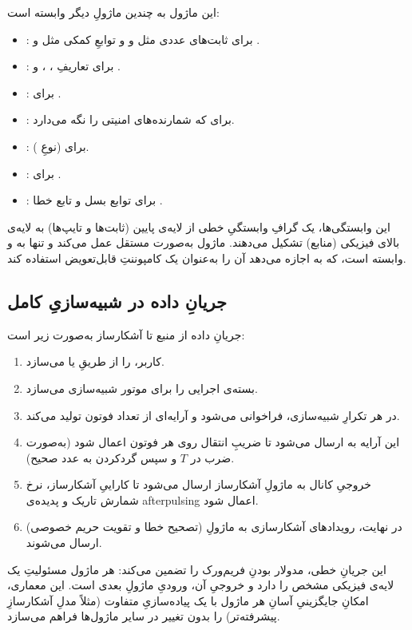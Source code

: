 این ماژول به چندین ماژولِ دیگر وابسته است:
\begin{itemize}
	\item {}: برای ثابت‌های عددی مثل  و  و توابعِ کمکی مثل  و .
	\item {}: برای تعاریفِ ، ،  و .
	\item {}: برای .
	\item {}: برای  که شمارنده‌های امنیتی را نگه می‌دارد.
	\item {}: برای  (نوعِ ).
	\item {}: برای .
	\item {}: برای توابع بسل  و تابع خطا .
\end{itemize}

این وابستگی‌ها، یک گرافِ وابستگیِ خطی از لایه‌ی پایین (ثابت‌ها و تایپ‌ها) به لایه‌ی بالای فیزیکی (منابع) تشکیل می‌دهند. ماژول  به‌صورت مستقل عمل می‌کند و تنها به  و  وابسته است، که به  اجازه می‌دهد آن را به‌عنوان یک کامپوننتِ قابل‌تعویض استفاده کند.

\subsection{جریانِ داده در شبیه‌سازیِ کامل}

جریانِ داده از منبع تا آشکارساز به‌صورت زیر است:
\begin{enumerate}
	\item کاربر،  را از طریقِ  یا  می‌سازد.
	\item {} بسته‌ی اجرایی را برای موتور شبیه‌سازی می‌سازد.
	\item در هر تکرارِ شبیه‌سازی،  فراخوانی می‌شود و آرایه‌ای از تعداد فوتون تولید می‌کند.
	\item این آرایه به  ارسال می‌شود تا ضریبِ انتقال روی هر فوتون اعمال شود (به‌صورت ضرب در $T$ و سپس گردکردن به عدد صحیح).
	\item خروجیِ کانال به ماژولِ آشکارساز  ارسال می‌شود تا کاراییِ آشکارساز، نرخ شمارش تاریک و پدیده‌ی afterpulsing اعمال شود.
	\item در نهایت، رویدادهای آشکارسازی به ماژولِ  (تصحیح خطا و تقویت حریم خصوصی) ارسال می‌شوند.
\end{enumerate}

این جریانِ خطی، مدولار بودنِ فریم‌ورک را تضمین می‌کند: هر ماژول مسئولیتِ یک لایه‌ی فیزیکی مشخص را دارد و خروجیِ آن، ورودیِ ماژولِ بعدی است. این معماری، امکانِ جایگزینیِ آسانِ هر ماژول با یک پیاده‌سازیِ متفاوت (مثلاً مدلِ آشکارسازِ پیشرفته‌تر) را بدون تغییر در سایر ماژول‌ها فراهم می‌سازد.
